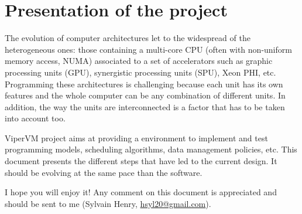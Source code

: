 \chapter{Presentation of the project}

The evolution of computer architectures let to the widespread of the
heterogeneous ones: those containing a multi-core CPU (often with non-uniform
memory access, NUMA) associated to a set of accelerators such as graphic
processing units (GPU), synergistic processing units (SPU), Xeon PHI, etc.
Programming these architectures is challenging because each unit has its own
features and the whole computer can be any combination of different units. In
addition, the way the units are interconnected is a factor that has to be taken
into account too.

ViperVM project aims at providing a environment to implement and test programming
models, scheduling algorithms, data management policies, etc. This document
presents the different steps that have led to the current design. It should be
evolving at the same pace than the software. 

I hope you will enjoy it! Any comment on this document is appreciated and should
be sent to me (Sylvain Henry, \url{hsyl20@gmail.com}).
